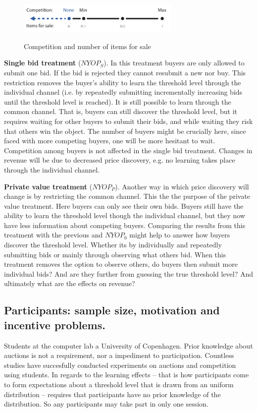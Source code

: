 \documentclass[a4paper,12pt]{article}
\begin{document}
	\begin{figure}[h]
	        \centering
	        \caption{Competition and number of items for sale}
	        \includegraphics[width=0.7\textwidth]{Figures/Competition-Items}
			\label{fig:competition-items}
	\end{figure}

	{\bf Single bid treatment} ($NYOP_S$).
	In this treatment buyers are only allowed to submit one bid. If the bid is rejected they cannot resubmit a new nor buy. This restriction removes the buyer's ability to learn the threshold level through the individual channel (i.e. by repeatedly submitting incrementally increasing bids until the threshold level is reached). It is still possible to learn through the common channel. That is, buyers can still discover the threshold level, but it requires waiting for other buyers to submit their bids, and while waiting they risk that others win the object. The number of buyers might be crucially here, since faced with more competing buyers, one will be more hesitant to wait. Competition among buyers is not affected in the single bid treatment. Changes in revenue will be due to decreased price discovery, e.g. no learning takes place through the individual channel.

	{\bf Private value treatment} ($NYOP_P$).
	Another way in which price discovery will change is by restricting the common channel. This the the purpose of the private value treatment. Here buyers can only see their own bids. Buyers still have the ability to learn the threshold level though the individual channel, but they now have less information about competing buyers. Comparing the results from this treatment with the previous and $NYOP_0$ might help to answer how buyers discover the threshold level. Whether its by individually and repeatedly submitting bids or mainly through observing what others bid. When this treatment removes the option to observe others, do buyers then submit more individual bids? And are they further from guessing the true threshold level? And ultimately what are the effects on revenue? 

	\subsection{Participants: sample size, motivation and incentive problems.}
	Students at the computer lab a University of Copenhagen. Prior knowledge about auctions is not a requirement, nor a impediment to participation. Countless studies have succesfully conducted experiments on auctions and competition using students. In regards to the learning effects -- that is how participants come to form expectations about a threshold level that is drawn from an uniform distribution -- requires that participants have no prior knowledge of the distribution. So any participants may take part in only one session.
	
\end{document}
